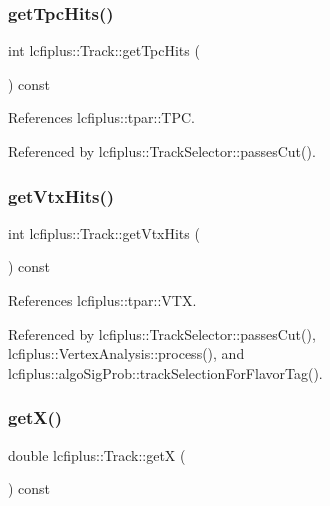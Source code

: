 \mbox{\label{classlcfiplus_1_1Track_aac7defeccfa11b959e3bc377cdfe09c1}} 
\subsubsection{get\+Tpc\+Hits()}
{\footnotesize\ttfamily int lcfiplus\+::\+Track\+::get\+Tpc\+Hits (\begin{DoxyParamCaption}{ }\end{DoxyParamCaption}) const\hspace{0.3cm}{\ttfamily [inline]}}



References lcfiplus\+::tpar\+::\+T\+PC.



Referenced by lcfiplus\+::\+Track\+Selector\+::passes\+Cut().

\mbox{\label{classlcfiplus_1_1Track_a64d9ecae19db2b598baf38450a1503d8}} 
\subsubsection{get\+Vtx\+Hits()}
{\footnotesize\ttfamily int lcfiplus\+::\+Track\+::get\+Vtx\+Hits (\begin{DoxyParamCaption}{ }\end{DoxyParamCaption}) const\hspace{0.3cm}{\ttfamily [inline]}}



References lcfiplus\+::tpar\+::\+V\+TX.



Referenced by lcfiplus\+::\+Track\+Selector\+::passes\+Cut(), lcfiplus\+::\+Vertex\+Analysis\+::process(), and lcfiplus\+::algo\+Sig\+Prob\+::track\+Selection\+For\+Flavor\+Tag().

\mbox{\label{classlcfiplus_1_1Track_ae4a6ca0102b37f3229aedc12b603d1b2}} 
\subsubsection{get\+X()}
{\footnotesize\ttfamily double lcfiplus\+::\+Track\+::getX (\begin{DoxyParamCaption}{ }\end{DoxyParamCaption}) const}




